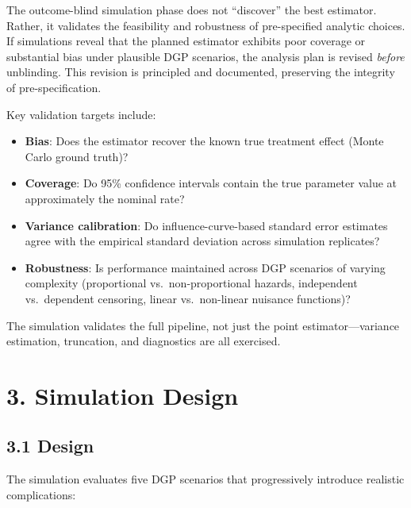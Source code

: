 \documentclass[
  letterpaper,
  DIV=11,
  numbers=noendperiod]{scrartcl}
\providecommand{\tightlist}{%
  \setlength{\itemsep}{0pt}\setlength{\parskip}{0pt}}\usepackage{longtable,booktabs,array}
\begin{document}
The outcome-blind simulation phase does not ``discover'' the best
estimator. Rather, it validates the feasibility and robustness of
pre-specified analytic choices. If simulations reveal that the planned
estimator exhibits poor coverage or substantial bias under plausible DGP
scenarios, the analysis plan is revised \emph{before} unblinding. This
revision is principled and documented, preserving the integrity of
pre-specification.

Key validation targets include:

\begin{itemize}
\tightlist
\item
  \textbf{Bias}: Does the estimator recover the known true treatment
  effect (Monte Carlo ground truth)?
\item
  \textbf{Coverage}: Do 95\% confidence intervals contain the true
  parameter value at approximately the nominal rate?
\item
  \textbf{Variance calibration}: Do influence-curve-based standard error
  estimates agree with the empirical standard deviation across
  simulation replicates?
\item
  \textbf{Robustness}: Is performance maintained across DGP scenarios of
  varying complexity (proportional vs.~non-proportional hazards,
  independent vs.~dependent censoring, linear vs.~non-linear nuisance
  functions)?
\end{itemize}

The simulation validates the full pipeline, not just the point
estimator---variance estimation, truncation, and diagnostics are all
exercised.

\section{3. Simulation Design}\label{simulation-design}

\subsection{3.1 Design}\label{design}

The simulation evaluates five DGP scenarios that progressively introduce
realistic complications:
\end{document}
